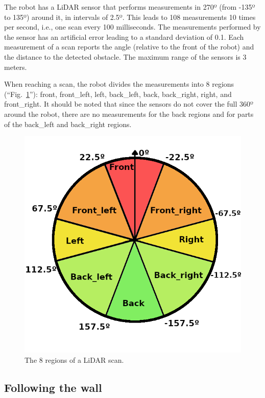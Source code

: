 \documentclass[conference]{IEEEtran}
\begin{document}
The robot has a LiDAR sensor that performs measurements in 270º (from -135º to 135º) around it, in intervals of 2.5º. This leads to 108 measurements 10 times per second, i.e., one scan every 100 milliseconds. The measurements performed by the sensor has an artificial error leading to a standard deviation of 0.1. Each measurement of a scan reports the angle (relative to the front of the robot) and the distance to the detected obstacle. The maximum range of the sensors is 3 meters.

When reaching a scan, the robot divides the measurements into 8 regions (``Fig.~\ref{fig:lidar}''): front, front\_left, left, back\_left, back, back\_right, right, and front\_right. It should be noted that since the sensors do not cover the full 360º around the robot, there are no measurements for the back regions and for parts of the back\_left and back\_right regions.

\begin{figure}[htbp]
    \centerline{\includegraphics{images/lidar.png}}
    \caption{The 8 regions of a LiDAR scan.}
    \label{fig:lidar}
\end{figure}

\subsection{Following the wall}
\end{document}
